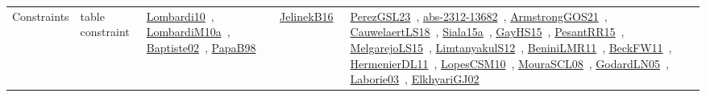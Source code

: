 {\begin{longtable}{lp{3cm}>{\raggedright\arraybackslash}p{6cm}>{\raggedright\arraybackslash}p{6cm}>{\raggedright\arraybackslash}p{8cm}}
Constraints & table constraint & \href{works/Lombardi10.pdf}{Lombardi10}~\cite{Lombardi10}, \href{works/LombardiM10a.pdf}{LombardiM10a}~\cite{LombardiM10a}, \href{works/Baptiste02.pdf}{Baptiste02}~\cite{Baptiste02}, \href{works/PapaB98.pdf}{PapaB98}~\cite{PapaB98} & \href{works/JelinekB16.pdf}{JelinekB16}~\cite{JelinekB16} & \href{works/PerezGSL23.pdf}{PerezGSL23}~\cite{PerezGSL23}, \href{works/abs-2312-13682.pdf}{abs-2312-13682}~\cite{abs-2312-13682}, \href{works/ArmstrongGOS21.pdf}{ArmstrongGOS21}~\cite{ArmstrongGOS21}, \href{works/CauwelaertLS18.pdf}{CauwelaertLS18}~\cite{CauwelaertLS18}, \href{works/Siala15a.pdf}{Siala15a}~\cite{Siala15a}, \href{works/GayHS15.pdf}{GayHS15}~\cite{GayHS15}, \href{works/PesantRR15.pdf}{PesantRR15}~\cite{PesantRR15}, \href{works/MelgarejoLS15.pdf}{MelgarejoLS15}~\cite{MelgarejoLS15}, \href{works/LimtanyakulS12.pdf}{LimtanyakulS12}~\cite{LimtanyakulS12}, \href{works/BeniniLMR11.pdf}{BeniniLMR11}~\cite{BeniniLMR11}, \href{works/BeckFW11.pdf}{BeckFW11}~\cite{BeckFW11}, \href{works/HermenierDL11.pdf}{HermenierDL11}~\cite{HermenierDL11}, \href{works/LopesCSM10.pdf}{LopesCSM10}~\cite{LopesCSM10}, \href{works/MouraSCL08.pdf}{MouraSCL08}~\cite{MouraSCL08}, \href{works/GodardLN05.pdf}{GodardLN05}~\cite{GodardLN05}, \href{works/Laborie03.pdf}{Laborie03}~\cite{Laborie03}, \href{works/ElkhyariGJ02.pdf}{ElkhyariGJ02}~\cite{ElkhyariGJ02}\\
\end{longtable}
}

